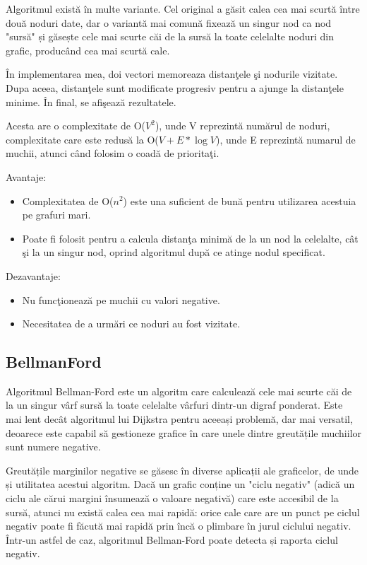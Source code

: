 \documentclass[runningheads]{llncs}
\begin{document}
Algoritmul există în multe variante. Cel original a găsit calea cea mai scurtă între două noduri date, dar o variantă mai comună fixează un singur nod ca nod "sursă" și găsește cele mai scurte căi de la sursă la toate celelalte noduri din grafic, producând cea mai scurtă cale.

\^{I}n implementarea mea, doi vectori memoreaza distan\c{t}ele \c{s}i nodurile vizitate. Dupa aceea, distan\c{t}ele sunt modificate progresiv pentru a ajunge la distan\c{t}ele minime. \^{I}n final, se afi\c{s}eaz\u{a} rezultatele.

Acesta are o complexitate de O($V^2$),  unde V reprezint\u{a} num\u{a}rul de noduri, complexitate care este redus\u{a} la O($V + E * \log{V}$), unde E reprezint\u{a} numarul de muchii, atunci c\^{a}nd folosim o coad\u{a} de priorita\c{t}i.

Avantaje:
\begin{itemize}
	\item Complexitatea de O($n^2$) este una suficient de bun\u{a} pentru utilizarea acestuia pe grafuri mari.
	\item Poate fi folosit pentru a calcula distan\c{t}a minim\u{a} de la un nod la celelalte, c\^{a}t \c{s}i la un singur nod, oprind algoritmul dup\u{a} ce atinge nodul specificat.
\end{itemize}

Dezavantaje:
\begin{itemize}
	\item Nu func\c{t}ioneaz\u{a} pe muchii cu valori negative.
	\item Necesitatea de a urm\u{a}ri ce noduri au fost vizitate.
\end{itemize}

\subsection{BellmanFord}
\hspace{20px}Algoritmul Bellman-Ford este un algoritm care calculează cele mai scurte căi de la un singur vârf sursă la toate celelalte vârfuri dintr-un digraf ponderat. Este mai lent decât algoritmul lui Dijkstra pentru aceeași problemă, dar mai versatil, deoarece este capabil să gestioneze grafice în care unele dintre greutățile muchiilor sunt numere negative.

Greutățile marginilor negative se găsesc în diverse aplicații ale graficelor, de unde și utilitatea acestui algoritm. Dacă un grafic conține un "ciclu negativ" (adică un ciclu ale cărui margini însumează o valoare negativă) care este accesibil de la sursă, atunci nu există calea cea mai rapidă: orice cale care are un punct pe ciclul negativ poate fi făcută mai rapidă prin încă o plimbare în jurul ciclului negativ. Într-un astfel de caz, algoritmul Bellman-Ford poate detecta și raporta ciclul negativ.
\end{document}
